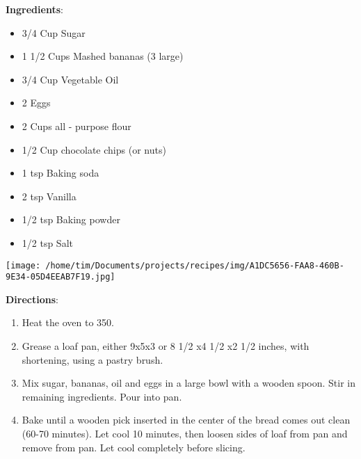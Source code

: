 \documentclass[11pt, twoside, openany]{book}
\begin{document}
\begin{minipage}[t]{0.8\linewidth}
\textbf{Ingredients}:\vspace{-3mm}
\begin{multicols}{2}
\begin{itemize}\setlength\itemsep{-1mm}
\item 3/4 Cup Sugar
\item 1 1/2 Cups Mashed bananas (3 large)
\item 3/4 Cup Vegetable Oil
\item 2 Eggs
\item 2 Cups all - purpose flour
\item 1/2 Cup chocolate chips (or nuts)
\item 1 tsp Baking soda
\item 2 tsp Vanilla
\item 1/2 tsp Baking powder
\item 1/2 tsp Salt
\end{itemize}
\end{multicols}
\end{minipage}
\begin{minipage}[t]{0.2\linewidth}
\centering \strut\vspace*{-\baselineskip}\newline
\texttt{[image: /home/tim/Documents/projects/recipes/img/A1DC5656-FAA8-460B-9E34-05D4EEAB7F19.jpg]}\\
\end{minipage}\vspace{3mm}
\textbf{Directions}:
\vspace{-3mm}\begin{enumerate}\setlength\itemsep{-1mm}
\item Heat the oven to 350.
\item Grease a loaf pan, either 9x5x3 or 8 1/2 x4 1/2 x2 1/2 inches, with shortening, using a pastry brush.
\item Mix sugar, bananas, oil and eggs in a large bowl with a wooden spoon. Stir in remaining ingredients. Pour into pan.
\item Bake until a wooden pick inserted in the center of the bread comes out clean (60-70 minutes). Let cool 10 minutes, then loosen sides of loaf from pan and remove from pan. Let cool completely before slicing. 
\end{enumerate}
 \label{white-thin-mints}\hfill\textit{}\\
\end{document}
